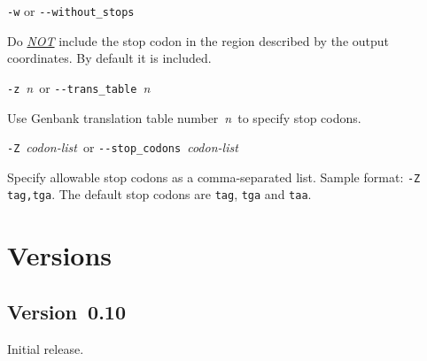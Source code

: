\documentclass[fleqn,titlepage,11pt]{article}
\def\Desc#1{\,\mbox{\emph{#1}}\,}
\def\Pg#1{\texttt{#1}}
\begin{document}
\exdent
  \verb`-w` \enskip or \enskip \verb`--without_stops`

  Do \underline{\emph{NOT}} include the stop codon in the region
  described by the output coordinates.  By default it is included.

\exdent
  \verb`-z` \Desc{n} \enskip or \enskip \verb`--trans_table` \Desc{n}

  Use Genbank translation table number \Desc{n} to specify stop codons.

\exdent
  \verb`-Z` \Desc{codon-list} \enskip or \enskip \verb`--stop_codons` \Desc{codon-list}

  Specify allowable stop codons as a comma-separated list.
  Sample format:  \verb`-Z tag,tga`.
  The default stop codons are \Pg{tag}, \Pg{tga} and \Pg{taa}.
\el

\section{Versions}

\subsection{Version~0.10}
  \bi\RaggedRight
  \item    
    Initial release.
  \ei

\raggedright


\end{document}
